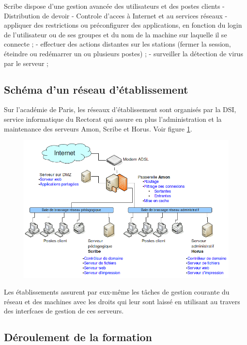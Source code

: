 \documentclass{article}
\makeatletter
\def\maxwidth{\ifdim\Gin@nat@width>\linewidth\linewidth
\else\Gin@nat@width\fi}
\let\Oldincludegraphics\includegraphics
\renewcommand{\includegraphics}[1]{\Oldincludegraphics[width=\maxwidth]{#1}}
\makeatother
\begin{document}
Scribe dispose d'une gestion avancée des utilisateurs et des postes
clients - Distribution de devoir - Controle d'acces à Internet et au
services réseaux - appliquer des restrictions ou pré­configurer des
applications, en fonction du login de l'utilisateur ou de ses groupes et
du nom de la machine sur laquelle il se connecte ; - effectuer des
actions distantes sur les stations (fermer la session, éteindre ou
redémarrer un ou plusieurs postes) ; - surveiller la détection de virus
par le serveur ;

\subsection{Schéma d'un réseau d'établissement}

Sur l'académie de Paris, les réseaux d'établissement sont organisés par
la DSI, service informatique du Rectorat qui assure en plus
l'administration et la maintenance des serveurs Amon, Scribe et Horus.
Voir figure \ref{2149feac}.

\begin{figure}[htbp]
\centering
\includegraphics{scribe_html_2149feac.png}
\caption{\label{2149feac}}
\end{figure}

Les établissements assurent par eux-même les tâches de gestion courante
du réseau et des machines avec les droits qui leur sont laissé en
utilisant au travers des interfcaes de gestion de ces serveurs.

\subsection{Déroulement de la formation}
\end{document}
